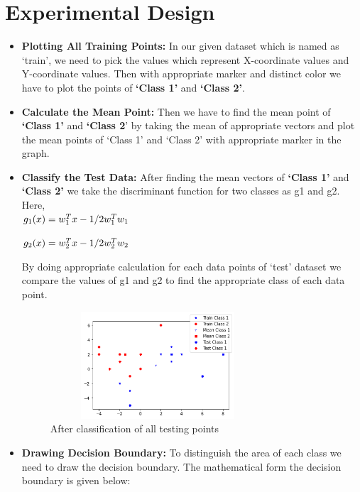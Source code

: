 \documentclass[conference]{IEEEtran}
\begin{document}
\section{Experimental Design}
\begin{itemize}  
	\item \textbf{Plotting All Training Points:}
	In our given dataset which is named as ‘train’, we need to pick the values which represent X-coordinate values and Y-coordinate values. Then with appropriate marker and distinct color we have to plot the points of \textbf{‘Class 1’} and \textbf{‘Class 2’}.\\
	\item \textbf{Calculate the Mean Point:}
Then we have to find the mean point of \textbf{‘Class 1’} and \textbf{‘Class 2}’ by taking the mean of appropriate vectors and plot the mean points of ‘Class 1’ and ‘Class 2’ with appropriate marker in the graph.\\
	\item \textbf{Classify the Test Data:}
After finding the mean vectors of \textbf{‘Class 1’} and \textbf{‘Class 2’} we take the discriminant function for two classes as g1 and g2.\\
 Here,\\
$
g_1 (x)=w_1^T x-1/2 w_1^T w_1\\$

$
g_2 (x)=w_2^T x-1/2 w_2^T w_2\\$

By doing appropriate calculation for each data points of ‘test’ dataset we compare the values of g1 and g2 to find the appropriate class of each data point.
\begin{figure}[htbp]
\centerline{\includegraphics[width=8cm, height=4cm]{points.png}}
\caption{After classification of all testing points}
\label{fig}
\end{figure}

\item \textbf{ Drawing Decision Boundary:}
To distinguish the area of each class we need to draw the decision boundary. The mathematical form the decision boundary is given below:\\


\end{itemize}
\end{document}
